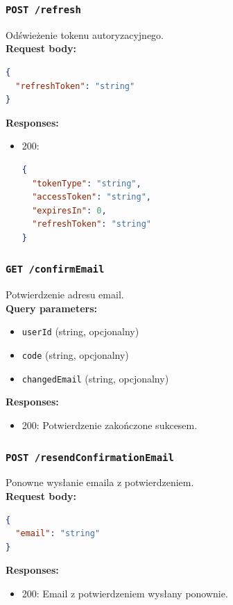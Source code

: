 \subsubsection{\lstinline[language=http]{POST /refresh}}
Odświeżenie tokenu autoryzacyjnego. \\
\textbf{Request body:}
\begin{lstlisting}[language=json]
{
  "refreshToken": "string"
}
\end{lstlisting}
\textbf{Responses:}
\begin{itemize}
    \item 200:
\begin{lstlisting}[language=json]
{
  "tokenType": "string",
  "accessToken": "string",
  "expiresIn": 0,
  "refreshToken": "string"
}
\end{lstlisting}
\end{itemize}

\subsubsection{\lstinline[language=http]{GET /confirmEmail}}
Potwierdzenie adresu email. \\
\textbf{Query parameters:}
\begin{itemize}
    \item \texttt{userId} (string, opcjonalny)
    \item \texttt{code} (string, opcjonalny)
    \item \texttt{changedEmail} (string, opcjonalny)
\end{itemize}
\textbf{Responses:}
\begin{itemize}
    \item 200: Potwierdzenie zakończone sukcesem.
\end{itemize}

\subsubsection{\lstinline[language=http]{POST /resendConfirmationEmail}}
Ponowne wysłanie emaila z potwierdzeniem. \\
\textbf{Request body:}
\begin{lstlisting}[language=json]
{
  "email": "string"
}
\end{lstlisting}
\textbf{Responses:}
\begin{itemize}
    \item 200: Email z potwierdzeniem wysłany ponownie.
\end{itemize}


